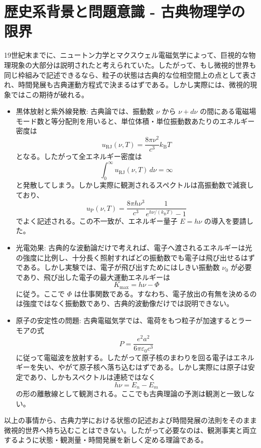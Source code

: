 \section{歴史系背景と問題意識 - 古典物理学の限界}

19世紀末までに、ニュートン力学とマクスウェル電磁気学によって、巨視的な物理現象の大部分は説明されたと考えられていた。したがって、もし微視的世界も同じ枠組みで記述できるなら、粒子の状態は古典的な位相空間上の点として表され、時間発展も古典運動方程式で決まるはずである。しかし実際には、微視的現象ではこの期待が破れる。
\begin{itemize}
\item{黒体放射と紫外線発散}: 
古典論では、振動数 $\nu$ から $\nu+d\nu$ の間にある電磁場モード数と等分配則を用いると、単位体積・単位振動数あたりのエネルギー密度は
\[
u_{\mathrm{RJ}}(\nu,T)=\frac{8\pi \nu^2}{c^3}k_{\mathrm{B}}T
\]
となる。したがって全エネルギー密度は
\[
\int_0^\infty u_{\mathrm{RJ}}(\nu,T)\,d\nu = \infty
\]
と発散してしまう。しかし実際に観測されるスペクトルは高振動数で減衰しており、
\[
u_{\mathrm{P}}(\nu,T)=\frac{8\pi h\nu^3}{c^3}\frac{1}{e^{h\nu/(k_{\mathrm{B}}T)}-1}
\]
でよく記述される。この不一致が、エネルギー量子 $E=h\nu$ の導入を要請した。

\item{光電効果}: 
古典的な波動論だけで考えれば、電子へ渡されるエネルギーは光の強度に比例し、十分長く照射すればどの振動数でも電子は飛び出せるはずである。しかし実験では、電子が飛び出すためにはしきい振動数 $\nu_0$ が必要であり、飛び出した電子の最大運動エネルギーは
\[
K_{\max}=h\nu-\Phi
\]
に従う。ここで $\Phi$ は仕事関数である。すなわち、電子放出の有無を決めるのは強度ではなく振動数であり、古典的波動像だけでは説明できない。

\item{原子の安定性の問題}: 
古典電磁気学では、電荷をもつ粒子が加速するとラーモアの式
\[
P=\frac{e^2 a^2}{6\pi\varepsilon_0 c^3}
\]
に従って電磁波を放射する。したがって原子核のまわりを回る電子はエネルギーを失い、やがて原子核へ落ち込むはずである。しかし実際には原子は安定であり、しかもスペクトルは連続ではなく
\[
h\nu = E_n-E_m
\]
の形の離散線として観測される。ここでも古典理論の予測は観測と一致しない。
\end{itemize}
以上の事情から、古典力学における状態の記述および時間発展の法則をそのまま微視的世界へ持ち込むことはできない。したがって必要なのは、観測事実と両立するように状態・観測量・時間発展を新しく定める理論である。
